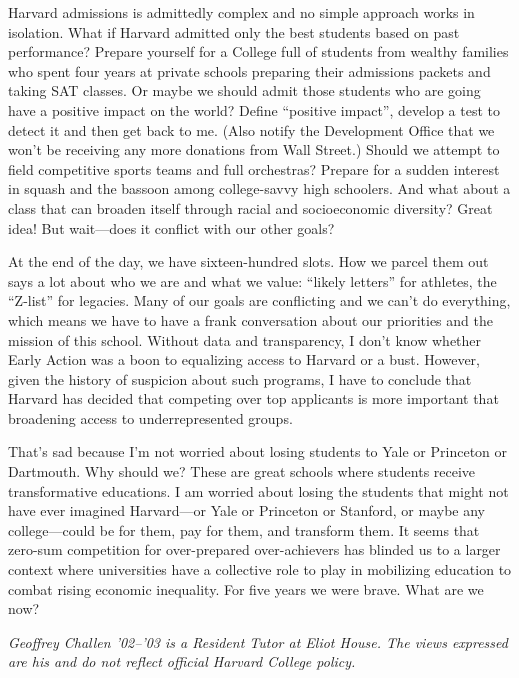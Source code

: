 Harvard admissions is admittedly complex and no simple approach works in
isolation. What if Harvard admitted only the best students based on past
performance? Prepare yourself for a College full of students from wealthy
families who spent four years at private schools preparing their admissions
packets and taking SAT classes. Or maybe we should admit those students who
are going have a positive impact on the world? Define ``positive impact'',
develop a test to detect it and then get back to me. (Also notify the
Development Office that we won't be receiving any more donations from Wall
Street.) Should we attempt to field competitive sports teams and full
orchestras? Prepare for a sudden interest in squash and the bassoon among
college-savvy high schoolers. And what about a class that can broaden itself
through racial and socioeconomic diversity? Great idea! But wait---does it
conflict with our other goals?

At the end of the day, we have sixteen-hundred slots. How we parcel them out
says a lot about who we are and what we value: ``likely letters'' for
athletes, the ``Z-list'' for legacies. Many of our goals are conflicting and
we can't do everything, which means we have to have a frank conversation
about our priorities and the mission of this school. Without data and
transparency, I don't know whether Early Action was a boon to equalizing
access to Harvard or a bust. However, given the history of suspicion about
such programs, I have to conclude that Harvard has decided that competing
over top applicants is more important that broadening access to
underrepresented groups.

That's sad because I'm not worried about losing students to Yale or Princeton
or Dartmouth. Why should we? These are great schools where students receive
transformative educations. I am worried about losing the students that might
not have ever imagined Harvard---or Yale or Princeton or Stanford, or maybe
any college---could be for them, pay for them, and transform them. It seems
that zero-sum competition for over-prepared over-achievers has blinded us to
a larger context where universities have a collective role to play in
mobilizing education to combat rising economic inequality. For five years we
were brave. What are we now?


\textit{Geoffrey Challen '02--'03 is a Resident Tutor at Eliot House. The
views expressed are his and do not reflect official Harvard College policy.}
